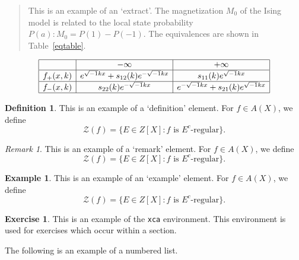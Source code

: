 \documentclass{mcom-l}
\theoremstyle{definition}
\newtheorem{definition}[theorem]{Definition}
\newtheorem{example}[theorem]{Example}
\newtheorem{xca}[theorem]{Exercise}
\theoremstyle{remark}
\newtheorem{remark}[theorem]{Remark}
\numberwithin{equation}{section}
\begin{document}
\begin{quotation}
This is an example of an `extract'. The magnetization $M_0$ of the Ising
model is related to the local state probability $P(a):M_0=P(1)-P(-1)$.
The equivalences are shown in Table~\ref{eqtable}.
\end{quotation}

\begin{table}[ht]
\caption{}\label{eqtable}
\renewcommand\arraystretch{1.5}
\noindent\[
\begin{array}{|c|c|c|}
\hline
&{-\infty}&{+\infty}\\
\hline
{f_+(x,k)}&e^{\sqrt{-1}kx}+s_{12}(k)e^{-\sqrt{-1}kx}&s_{11}(k)e^
{\sqrt{-1}kx}\\
\hline
{f_-(x,k)}&s_{22}(k)e^{-\sqrt{-1}kx}&e^{-\sqrt{-1}kx}+s_{21}(k)e^{\sqrt
{-1}kx}\\
\hline
\end{array}
\]
\end{table}

\begin{definition}
This is an example of a `definition' element.
For $f\in A(X)$, we define
\begin{equation}
\mathcal{Z} (f)=\{E\in Z[X]: \text{$f$ is $E^c$-regular}\}.
\end{equation}
\end{definition}

\begin{remark}
This is an example of a `remark' element.
For $f\in A(X)$, we define
\begin{equation}
\mathcal{Z} (f)=\{E\in Z[X]: \text{$f$ is $E^c$-regular}\}.
\end{equation}
\end{remark}

\begin{example}
This is an example of an `example' element.
For $f\in A(X)$, we define
\begin{equation}
\mathcal{Z} (f)=\{E\in Z[X]: \text{$f$ is $E^c$-regular}\}.
\end{equation}
\end{example}

\begin{xca}
This is an example of the \texttt{xca} environment. This environment is
used for exercises which occur within a section.
\end{xca}

The following is an example of a numbered list.
\end{document}

